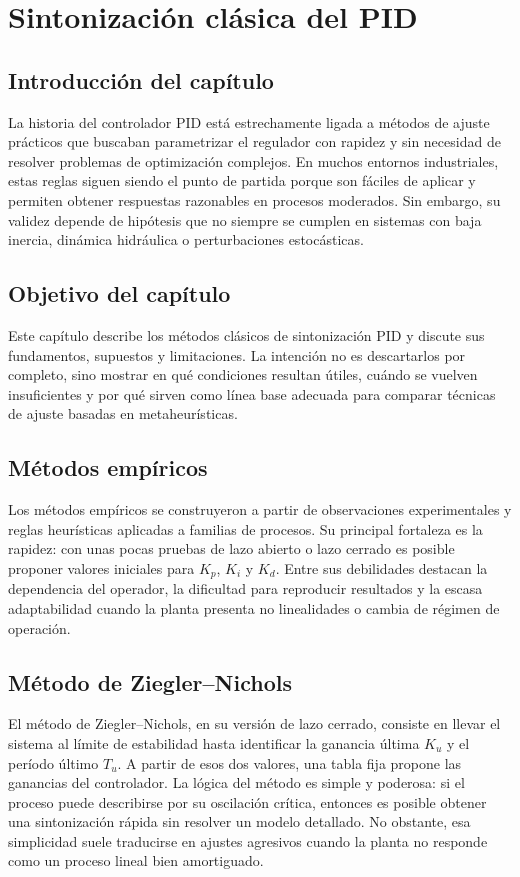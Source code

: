 \chapter{Sintonización clásica del PID}
\label{ch:sintonizacion-clasica}

\section{Introducción del capítulo}
La historia del controlador PID está estrechamente ligada a métodos de ajuste prácticos que
buscaban parametrizar el regulador con rapidez y sin necesidad de resolver problemas de
optimización complejos. En muchos entornos industriales, estas reglas siguen siendo el punto
de partida porque son fáciles de aplicar y permiten obtener respuestas razonables en procesos
moderados. Sin embargo, su validez depende de hipótesis que no siempre se cumplen en
sistemas con baja inercia, dinámica hidráulica o perturbaciones estocásticas.

\section{Objetivo del capítulo}
Este capítulo describe los métodos clásicos de sintonización PID y discute sus fundamentos,
supuestos y limitaciones. La intención no es descartarlos por completo, sino mostrar en qué
condiciones resultan útiles, cuándo se vuelven insuficientes y por qué sirven como línea base
adecuada para comparar técnicas de ajuste basadas en metaheurísticas.

\section{Métodos empíricos}
Los métodos empíricos se construyeron a partir de observaciones experimentales y reglas
heurísticas aplicadas a familias de procesos. Su principal fortaleza es la rapidez: con unas
pocas pruebas de lazo abierto o lazo cerrado es posible proponer valores iniciales para
$K_p$, $K_i$ y $K_d$. Entre sus debilidades destacan la dependencia del operador, la dificultad
para reproducir resultados y la escasa adaptabilidad cuando la planta presenta no linealidades
o cambia de régimen de operación.

\section{Método de Ziegler--Nichols}
El método de Ziegler--Nichols, en su versión de lazo cerrado, consiste en llevar el sistema al
límite de estabilidad hasta identificar la ganancia última $K_u$ y el período último $T_u$. A
partir de esos dos valores, una tabla fija propone las ganancias del controlador. La lógica del
método es simple y poderosa: si el proceso puede describirse por su oscilación crítica,
entonces es posible obtener una sintonización rápida sin resolver un modelo detallado. No
obstante, esa simplicidad suele traducirse en ajustes agresivos cuando la planta no responde
como un proceso lineal bien amortiguado.

